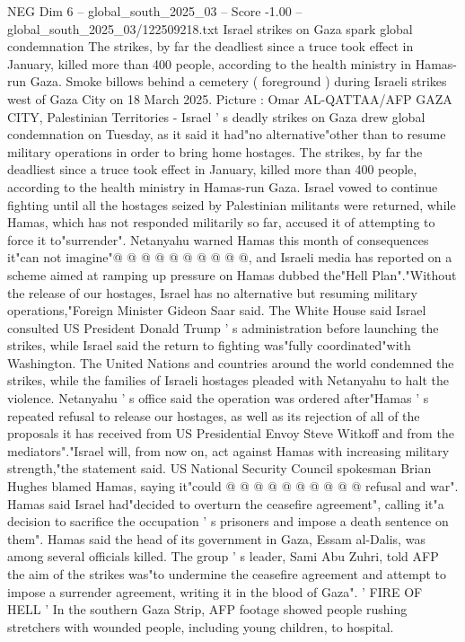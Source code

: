 \begin{textsample}{NEG Dim 6 – global\_south\_2025\_03 – Score -1.00 – global\_south\_2025\_03/122509218.txt}  \label{ex:f6_neg_141}
Israel strikes on Gaza spark global condemnation The strikes, by far the deadliest since a truce took effect in January, killed more than 400 people, according to the health ministry in Hamas-run Gaza.
Smoke billows behind a cemetery ( foreground ) during Israeli strikes west of Gaza City on 18 March 2025.
Picture : Omar AL-QATTAA/AFP GAZA CITY, Palestinian Territories - Israel ' s deadly strikes on Gaza drew global condemnation on Tuesday, as it said it had"no alternative"other than to resume military operations in order to bring home hostages.
The strikes, by far the deadliest since a truce took effect in January, killed more than 400 people, according to the health ministry in Hamas-run Gaza.
Israel vowed to continue fighting until all the hostages seized by Palestinian militants were returned, while Hamas, which has not responded militarily so far, accused it of attempting to force it to"surrender".
Netanyahu warned Hamas this month of consequences it"can not imagine"@ @ @ @ @ @ @ @ @ @, and Israeli media has reported on a scheme aimed at ramping up pressure on Hamas dubbed the"Hell Plan"."Without the release of our hostages, Israel has no alternative but resuming military operations,"Foreign Minister Gideon Saar said.
The White House said Israel consulted US President Donald Trump ' s administration before launching the strikes, while Israel said the return to fighting was"fully coordinated"with Washington.
The United Nations and countries around the world condemned the strikes, while the families of Israeli hostages pleaded with Netanyahu to halt the violence.
Netanyahu ' s office said the operation was ordered after"Hamas ' s repeated refusal to release our hostages, as well as its rejection of all of the proposals it has received from US Presidential Envoy Steve Witkoff and from the mediators"."Israel will, from now on, act against Hamas with increasing military strength,"the statement said.
US National Security Council spokesman Brian Hughes blamed Hamas, saying it"could @ @ @ @ @ @ @ @ @ @ refusal and war".
Hamas said Israel had"decided to overturn the ceasefire agreement", calling it"a decision to sacrifice the occupation ' s prisoners and impose a death sentence on them".
Hamas said the head of its government in Gaza, Essam al-Dalis, was among several officials killed.
The group ' s leader, Sami Abu Zuhri, told AFP the aim of the strikes was"to undermine the ceasefire agreement and attempt to impose a surrender agreement, writing it in the blood of Gaza". ' FIRE OF HELL ' In the southern Gaza Strip, AFP footage showed people rushing stretchers with wounded people, including young children, to hospital.

\end{textsample}
